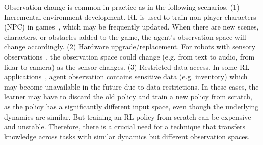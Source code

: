 Observation change is common in practice as in the following scenarios.
(1) Incremental environment development. RL is used to train non-player characters (NPC) in games~\citep{juliani2018unity}, which may be frequently updated. 
When there are new scenes, characters, or obstacles added to the game, the agent's observation space will change accordingly.
(2) Hardware upgrade/replacement. For robots with sensory observations~\citep{bohez2017sensor}, the observation space could change (e.g. from text to audio, from lidar to camera) as the sensor changes.
(3) Restricted data access. In some RL applications~\citep{ganesh2019reinforcement}, agent observation contains sensitive data (e.g. inventory) which may become unavailable in the future due to data restrictions. 
In these cases, the learner may have to discard the old policy and train a new policy from scratch, as the policy has a significantly different input space, even though the underlying dynamics are similar. But training an RL policy from scratch can be expensive and unstable. Therefore, there is a crucial need for a technique that transfers knowledge across tasks with similar dynamics but different observation spaces.

